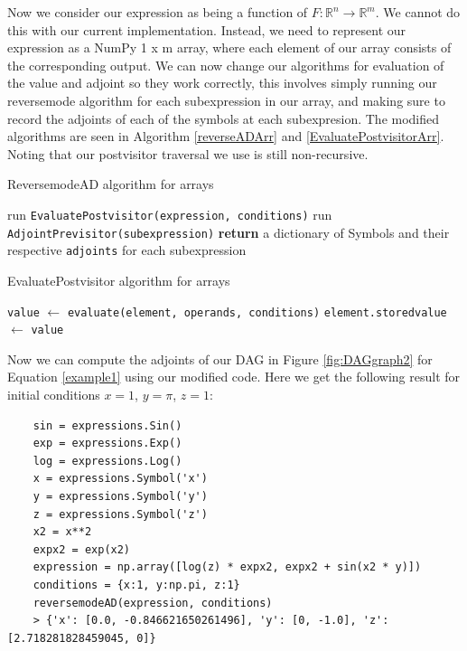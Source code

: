 \documentclass{article}
\begin{document}
Now we consider our expression as being a function of $F: \mathbb{R}^n \longrightarrow \mathbb{R}^m$. We cannot do this with our current implementation. Instead, we need to represent our expression as a NumPy 1 x m array, where each element of our array consists of the corresponding output. We can now change our algorithms for evaluation of the value and adjoint so they work correctly, this involves simply running our reversemode algorithm for each subexpression in our array, and making sure to record the adjoints of each of the symbols at each subexpresion. The modified algorithms are seen in Algorithm \ref{reverseADArr} and \ref{EvaluatePostvisitorArr}. Noting that our postvisitor traversal we use is still non-recursive.

\begin{algorithm}[h]
\caption{ReversemodeAD algorithm for arrays}\label{reverseADArr}
\begin{algorithmic}[1]
\State run \verb|EvaluatePostvisitor(expression, conditions)|
\State run \verb|AdjointPrevisitor(subexpression)|
\EndFor
\State \textbf{return} a dictionary of Symbols and their respective \verb|adjoints| for each subexpression
\EndProcedure
\end{algorithmic}
\end{algorithm}

\begin{algorithm}[h!]
\caption{EvaluatePostvisitor algorithm for arrays}\label{EvaluatePostvisitorArr}
\begin{algorithmic}[1]
\State \verb|value| $\gets$ \verb|evaluate(element, operands, conditions)|
\State \verb|element.storedvalue| $\gets$ \verb|value|
\EndFor
\EndFor
\EndProcedure
\end{algorithmic}
\end{algorithm}

Now we can compute the adjoints of our DAG in Figure \ref{fig:DAGgraph2} for Equation \ref{example1} using our modified code. Here we get the following result for initial conditions $x=1$, $y=\pi$, $z=1$:

\begin{verbatim}
    sin = expressions.Sin()
    exp = expressions.Exp()
    log = expressions.Log()
    x = expressions.Symbol('x')
    y = expressions.Symbol('y')
    z = expressions.Symbol('z')
    x2 = x**2
    expx2 = exp(x2)
    expression = np.array([log(z) * expx2, expx2 + sin(x2 * y)])
    conditions = {x:1, y:np.pi, z:1}
    reversemodeAD(expression, conditions)
    > {'x': [0.0, -0.846621650261496], 'y': [0, -1.0], 'z': [2.718281828459045, 0]}
\end{verbatim}
\end{document}
